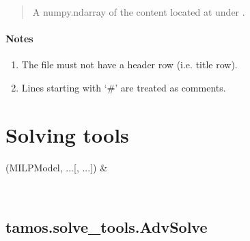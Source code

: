 \documentclass[letterpaper,10pt,english]{sphinxmanual}
\begin{document}
\begin{fulllineitems}
\begin{quote}
\begin{description}
\begin{itemize}
\end{itemize}

\sphinxAtStartPar
A numpy.ndarray of the content located at  under .

\end{description}\end{quote}
\subsubsection*{Notes}
\begin{enumerate}
%
\item {} 
\sphinxAtStartPar
The file must not have a header row (i.e. title row).

\item {} 
\sphinxAtStartPar
Lines starting with ‘\#’ are treated as comments.

\end{enumerate}

\end{fulllineitems}


\sphinxstepscope


\chapter{Solving tools}
\label{\detokenize{solve_tools:solving-tools}}\label{\detokenize{solve_tools::doc}}

\begin{savenotes}\sphinxattablestart
\centering
\begin{tabulary}{\linewidth}[t]{}
\hline

\sphinxAtStartPar
{\hyperref[\detokenize{generated/tamos.solve_tools.AdvSolve:tamos.solve_tools.AdvSolve}]{}}(MILPModel, ...{[}, ...{]})
&
\sphinxAtStartPar

\\
\hline
\end{tabulary}
\par
\sphinxattableend\end{savenotes}

\sphinxstepscope


\section{tamos.solve\_tools.AdvSolve}
\label{\detokenize{generated/tamos.solve_tools.AdvSolve:tamos-solve-tools-advsolve}}\label{\detokenize{generated/tamos.solve_tools.AdvSolve::doc}}
\end{document}
